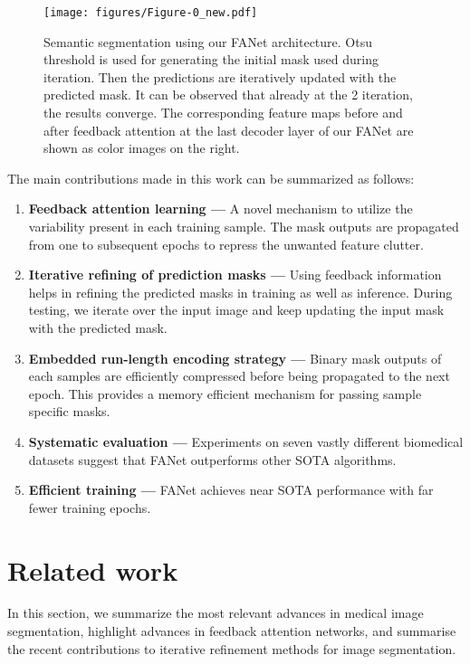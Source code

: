 \documentclass[journal]{IEEEtran}
\begin{document}
\begin{figure*}[t!]
    \centering
    \texttt{[image: figures/Figure-0\_new.pdf]}
    \caption{Semantic segmentation using our FANet architecture. Otsu threshold is used for generating the initial mask used during  iteration. Then the predictions are iteratively updated with the predicted mask. It can be observed that already at the 2 iteration, the results converge. The corresponding feature maps before and after feedback attention at the last decoder layer of our FANet are shown as color images on the right.}\label{fig:fig0-examplary}
\end{figure*}
The main contributions made in this work can be summarized as follows:
\begin{enumerate}


    \item \textbf{Feedback attention learning --- } A novel mechanism to utilize the variability present in each training sample. The mask outputs are propagated from one to subsequent epochs to repress the unwanted feature clutter.

   \item \textbf{Iterative refining of prediction masks --- } Using feedback information helps in refining the predicted masks in training as well as inference. During testing, we iterate over the input image and keep updating the input mask with the predicted mask.
\item \textbf{Embedded run-length encoding strategy --- } Binary mask outputs of each samples are efficiently compressed before being propagated to the next epoch. This provides a memory efficient mechanism for passing sample specific masks.
\item \textbf{Systematic evaluation --- } Experiments on seven vastly different biomedical datasets suggest that FANet outperforms other \ac{SOTA} algorithms.

    \item \textbf{Efficient training --- } FANet achieves near \ac{SOTA} performance with far fewer training epochs. 
\end{enumerate}

\section{Related work}
\label{relatedwork}
In this section, we summarize the most relevant advances in medical image segmentation, highlight advances in feedback attention networks, and summarise the recent contributions to iterative refinement methods for image segmentation. 
\end{document}
